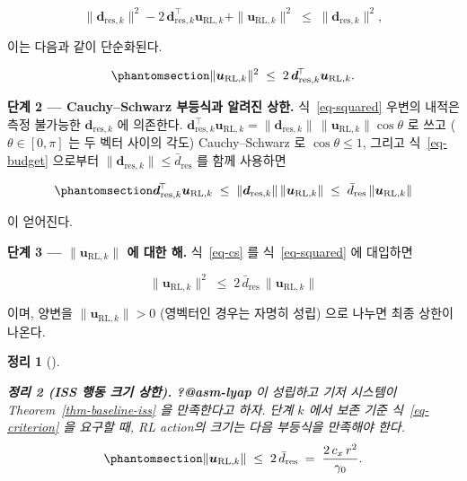 \documentclass[
  11pt,
]{article}
\theoremstyle{plain}
\theoremstyle{plain}
\newtheorem{theorem}{정리}[section]
\theoremstyle{definition}
\theoremstyle{remark}
\begin{document}
\[
\|\bm{d}_{\mathrm{res},k}\|^2
- 2\,\bm{d}_{\mathrm{res},k}^{\!\top}\bm{u}_{\mathrm{RL},k}
+ \|\bm{u}_{\mathrm{RL},k}\|^2
\;\le\;
\|\bm{d}_{\mathrm{res},k}\|^2,
\]

이는 다음과 같이 단순화된다.

\begin{equation}\protect\phantomsection\label{eq-squared}{
\|\bm{u}_{\mathrm{RL},k}\|^2
\;\le\;
2\,\bm{d}_{\mathrm{res},k}^{\!\top}\bm{u}_{\mathrm{RL},k}.
}\end{equation}

\textbf{단계 2 --- Cauchy--Schwarz 부등식과 알려진 상한.}
식~\ref{eq-squared} 우변의 내적은 측정 불가능한
\(\bm{d}_{\mathrm{res},k}\) 에 의존한다.
\(\bm{d}_{\mathrm{res},k}^{\!\top}\bm{u}_{\mathrm{RL},k} =
\|\bm{d}_{\mathrm{res},k}\|\,\|\bm{u}_{\mathrm{RL},k}\|\cos\theta\) 로
쓰고 (\(\theta \in [0,\pi]\) 는 두 벡터 사이의 각도) Cauchy--Schwarz 로
\(\cos\theta \le 1\), 그리고 식~\ref{eq-budget} 으로부터
\(\|\bm{d}_{\mathrm{res},k}\| \le \bar{d}_{\mathrm{res}}\) 를 함께
사용하면

\begin{equation}\protect\phantomsection\label{eq-cs}{
\bm{d}_{\mathrm{res},k}^{\!\top}\bm{u}_{\mathrm{RL},k}
\;\le\;
\|\bm{d}_{\mathrm{res},k}\|\,\|\bm{u}_{\mathrm{RL},k}\|
\;\le\;
\bar{d}_{\mathrm{res}}\,\|\bm{u}_{\mathrm{RL},k}\|
}\end{equation}

이 얻어진다.

\textbf{단계 3 --- \(\|\bm{u}_{\mathrm{RL},k}\|\) 에 대한 해.}
식~\ref{eq-cs} 를 식~\ref{eq-squared} 에 대입하면

\[
\|\bm{u}_{\mathrm{RL},k}\|^2
\;\le\;
2\,\bar{d}_{\mathrm{res}}\,\|\bm{u}_{\mathrm{RL},k}\|
\]

이며, 양변을 \(\|\bm{u}_{\mathrm{RL},k}\| > 0\) (영벡터인 경우는 자명히
성립) 으로 나누면 최종 상한이 나온다.

\begin{theorem}[]\protect\hypertarget{thm-ceiling}{}\label{thm-ceiling}

\textbf{정리 2 (ISS 행동 크기 상한).} \textbf{?@asm-lyap} 이 성립하고
기저 시스템이 Theorem~\ref{thm-baseline-iss} 을 만족한다고 하자. 단계
\(k\) 에서 보존 기준 식~\ref{eq-criterion} 을 요구할 때, RL action의
크기는 다음 부등식을 만족해야 한다.
\begin{equation}\protect\phantomsection\label{eq-ceiling}{
\|\bm{u}_{\mathrm{RL},k}\|
\;\le\;
2\,\bar{d}_{\mathrm{res}}
\;=\;
\frac{2\,c_x\,r^2}{\gamma_0}.
}\end{equation}

\end{theorem}
\end{document}
